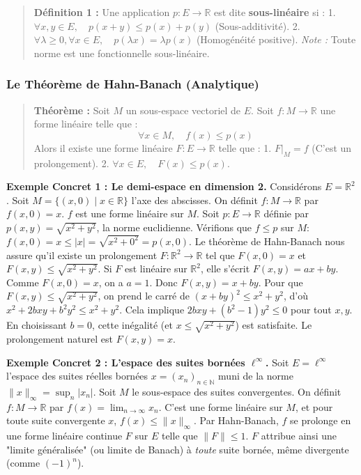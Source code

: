 \documentclass[11pt,a4paper]{article}
\begin{document}
\begin{quote}\textbf{Définition 1 :} Une application $p : E \to \mathbb{R}$ est dite \textbf{sous-linéaire} si :
1. $\forall x, y \in E, \quad p(x+y) \le p(x) + p(y)$ (Sous-additivité).
2. $\forall \lambda \ge 0, \forall x \in E, \quad p(\lambda x) = \lambda p(x)$ (Homogénéité positive).
\textit{Note :} Toute norme est une fonctionnelle sous-linéaire.\end{quote}

\subsubsection{Le Théorème de Hahn-Banach (Analytique)}

\begin{quote}\textbf{Théorème :}
Soit $M$ un sous-espace vectoriel de $E$. Soit $f : M \to \mathbb{R}$ une forme linéaire telle que :
$$\forall x \in M, \quad f(x) \le p(x)$$
Alors il existe une forme linéaire $F : E \to \mathbb{R}$ telle que :
1. $F|_M = f$ (C'est un prolongement).
2. $\forall x \in E, \quad F(x) \le p(x)$.\end{quote}



\textbf{Exemple Concret 1 : Le demi-espace en dimension 2.}
Considérons $E = \mathbb{R}^2$. Soit $M = \{(x, 0) \mid x \in \mathbb{R}\}$ l'axe des abscisses.
On définit $f : M \to \mathbb{R}$ par $f(x, 0) = x$. $f$ est une forme linéaire sur $M$.
Soit $p : E \to \mathbb{R}$ définie par $p(x, y) = \sqrt{x^2 + y^2}$, la norme euclidienne.
Vérifions que $f \le p$ sur $M$:
$f(x, 0) = x \le |x| = \sqrt{x^2 + 0^2} = p(x, 0)$.
Le théorème de Hahn-Banach nous assure qu'il existe un prolongement $F : \mathbb{R}^2 \to \mathbb{R}$ tel que $F(x, 0) = x$ et $F(x, y) \le \sqrt{x^2 + y^2}$.
Si $F$ est linéaire sur $\mathbb{R}^2$, elle s'écrit $F(x, y) = ax + by$.
Comme $F(x, 0) = x$, on a $a = 1$. Donc $F(x, y) = x + by$.
Pour que $F(x, y) \le \sqrt{x^2 + y^2}$, on prend le carré de $(x+by)^2 \le x^2 + y^2$, d'où $x^2 + 2bxy + b^2y^2 \le x^2 + y^2$.
Cela implique $2bxy + (b^2-1)y^2 \le 0$ pour tout $x,y$. En choisissant $b=0$, cette inégalité (et $x \le \sqrt{x^2+y^2}$) est satisfaite.
Le prolongement naturel est $F(x, y) = x$.

\textbf{Exemple Concret 2 : L'espace des suites bornées $\ell^\infty$.}
Soit $E = \ell^\infty$ l'espace des suites réelles bornées $x = (x_n)_{n \in \mathbb{N}}$ muni de la norme $\|x\|_\infty = \sup_{n} |x_n|$.
Soit $M$ le sous-espace des suites convergentes. On définit $f : M \to \mathbb{R}$ par $f(x) = \lim_{n \to \infty} x_n$.
C'est une forme linéaire sur $M$, et pour toute suite convergente $x$, $f(x) \le \|x\|_\infty$.
Par Hahn-Banach, $f$ se prolonge en une forme linéaire continue $F$ sur $E$ telle que $\|F\| \le 1$.
$F$ attribue ainsi une "limite généralisée" (ou limite de Banach) à \textit{toute} suite bornée, même divergente (comme $(-1)^n$).
\end{document}
